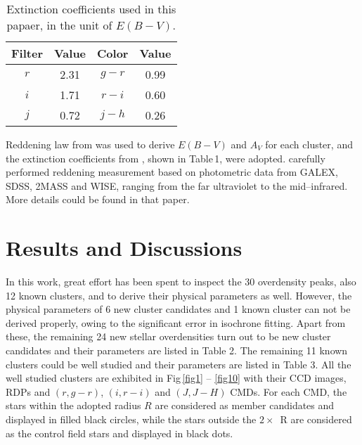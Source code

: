 \documentclass[]{raa_rb}
\begin{document}
\begin{table}
\caption{Extinction coefficients used in this papaer, in the unit of $E(B-V)$.}
\label{extins}
\begin{tabular}{c|c|c|c}
\hline
Filter & Value & Color & Value \\ \hline
 $r$   & 2.31  & $g-r$ & 0.99  \\
 $i$   & 1.71  & $r-i$ & 0.60  \\ 
 $j$   & 0.72  & $j-h$ & 0.26  \\ \hline
\end{tabular}
\end{table}


Reddening law from \cite{Yadav2011} was used to derive $E(B-V)$ and $A_V$ for each cluster, 
and the extinction coefficients from \cite{Yuanext2013}, shown in Table\,1, were adopted.   \cite{Yuanext2013} 
carefully performed reddening measurement based on photometric data from GALEX, SDSS, 2MASS and WISE, 
ranging from the far ultraviolet to the mid--infrared. More details could be found in that paper.

\section{Results and Discussions}


In this work, great effort has been spent to inspect the 30 overdensity peaks, also 12 known clusters, and to derive their physical parameters as well. However, the physical parameters of 6 new cluster candidates and 1 known cluster can not be derived properly, owing to the significant error in isochrone fitting. Apart from these, the remaining 24 new stellar overdensities turn out to be new cluster candidates and their parameters are listed in Table 2.  The remaining 11 known clusters could be well studied and their parameters are listed in Table 3. All the well studied clusters are exhibited in Fig\,\ref{fig1} -- \ref{fig10} with their CCD images, RDPs and $(r, g-r)$, $(i, r-i)$ and $(J, J-H)$ CMDs. For each CMD, the stars within the adopted radius $R$ are considered as member candidates and displayed in filled black circles, while the stars outside the $2\times$~R are considered as the control field stars and displayed in black dots. 
\end{document}
